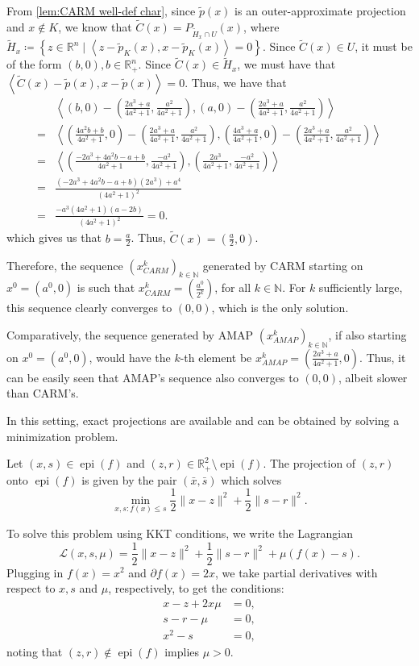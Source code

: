 \documentclass[smallextended,numbook,nospthms]{svjour3}
\theoremstyle{plain}
\theoremstyle{definition}
\def\RR{\mathds R}
\def\NN{\mathds N}
\DeclareMathOperator{\epi}{epi}
\newcommand{\scal}[2]{\left\langle{#1},{#2}  \right\rangle}
\begin{document}
From \cref{lem:CARM well-def char}, since $\tilde{p}(x)$ is an outer-approximate projection and $x \notin K$, we know that $\tilde{C}(x)=P_{\tilde{H}_{x} \cap U}(x)$, where $\tilde{H}_{x}\coloneqq \left\{z \in \RR^{n} \mid \scal{z-\tilde{p}_{K}(x)}{x-\tilde{p}_{K}(x)}=0\right\}$. Since $\tilde{C}(x) \in U$, it must be of the form $(b,0), b \in \RR^{n}_{+}$. Since $\tilde{C}(x) \in \tilde{H}_{x}$, we must have that $\scal{\tilde{C}(x)-\tilde{p}(x)}{x-\tilde{p}(x)}=0$. Thus, we have that
\begin{align}
	&\scal{(b,0)-\left(\frac{2a^3+a}{4a^2+1},\frac{a^2}{4a^2+1}\right)}{(a,0)-\left(\frac{2a^3+a}{4a^2+1},\frac{a^2}{4a^2+1}\right)} \\
	=&\scal{\left(\frac{4a^2b+b}{4a^2+1},0\right)-\left(\frac{2a^3+a}{4a^2+1},\frac{a^2}{4a^2+1}\right)}{\left(\frac{4a^3+a}{4a^2+1},0\right)-\left(\frac{2a^3+a}{4a^2+1},\frac{a^2}{4a^2+1}\right)} \\
	=&\scal{\left(\frac{-2a^3+4a^2b-a+b}{4a^2+1},\frac{-a^2}{4a^2+1}\right)}{\left(\frac{2a^3}{4a^2+1},\frac{-a^2}{4a^2+1}\right)} \\
	=&\frac{(-2a^3+4a^2b-a+b)(2a^3)+a^4}{(4a^2+1)^2} \\
	=&\frac{-a^3(4a^2+1)(a-2b)}{(4a^2+1)^2}=0.
\end{align}
which gives us that $b = \frac{a}{2}$. Thus, $\tilde{C}(x)=\left(\frac{a}{2},0\right)$.

Therefore, the sequence $(x^{k}_{CARM})_{k \in \NN}$ generated by CARM starting on $x^0=(a^0,0)$ is such that $x^{k}_{CARM}=\left(\frac{a^0}{2^k}\right)$, for all $k \in \NN$. For $k$ sufficiently large, this sequence clearly converges to $(0,0)$, which is the only solution.

Comparatively, the sequence generated by AMAP $(x^{k}_{AMAP})_{k \in \NN}$, if also starting on $x^0=(a^0,0)$, would have the $k$-th element be $x^{k}_{AMAP}=\left(\frac{2a^3+a}{4a^2+1},0\right)$. Thus, it can be easily seen that AMAP's sequence also converges to $(0,0)$, albeit slower than CARM's.

In this setting, exact projections are available and can be obtained by solving a minimization problem.

Let $(x,s) \in \epi(f)$ and $(z,r) \in \RR^{2}_{+} \setminus \epi(f)$. The projection of $(z,r)$ onto $\epi(f)$ is given by the pair $(\bar{x},\bar{s})$ which solves
\[
\min_{x,s: f(x) \leq s} \frac{1}{2} \|x-z\|^2 + \frac{1}{2} \|s-r\|^2. \label{eq:min toy}
\]

To solve this problem using KKT conditions, we write the Lagrangian
\[
\mathcal{L}(x,s,\mu)=\frac{1}{2} \|x-z\|^2 + \frac{1}{2} \|s-r\|^2 + \mu(f(x)-s).
\]
Plugging in $f(x)=x^2$ and $\partial f(x)=2x$, we take partial derivatives with respect to $x,s$ and $\mu$, respectively, to get the conditions:
\begin{align}
	x-z+2x\mu&=0, \\
	s-r-\mu&=0, \\
	x^2-s&=0,
\end{align}
noting that $(z,r) \notin \epi(f)$ implies $\mu>0$.
\end{document}
